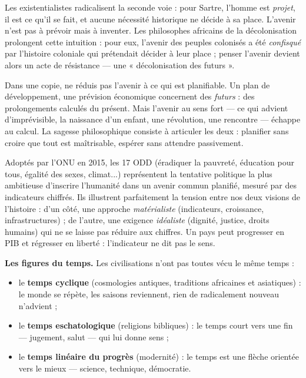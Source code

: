 \documentclass[11pt]{article}
\newcounter{popsec}
\newcounter{popsub}
\newcommand{\courssub}[1]{%
  \stepcounter{popsub}%
  \par\vspace{9pt}\noindent{\popxbold\fontsize{11.5}{13}\selectfont\color{popink}{\color{poporange}\thepopsec.\thepopsub}\hspace{6pt}#1}\par\nopagebreak\vspace{4pt}
}
\begin{document}
Les existentialistes radicalisent la seconde voie : pour Sartre, l'homme est \emph{projet}, il est ce qu'il se fait, et aucune nécessité historique ne décide à sa place. L'avenir n'est pas à prévoir mais à inventer. Les philosophes africains de la décolonisation prolongent cette intuition : pour eux, l'avenir des peuples colonisés a été \emph{confisqué} par l'histoire coloniale qui prétendait décider à leur place ; penser l'avenir devient alors un acte de résistance — une « décolonisation des futurs ».

\begin{attention}
Dans une copie, ne réduis pas l'avenir à ce qui est planifiable. Un plan de développement, une prévision économique concernent des \emph{futurs} : des prolongements calculés du présent. Mais l'avenir au sens fort — ce qui advient d'imprévisible, la naissance d'un enfant, une révolution, une rencontre — échappe au calcul. La sagesse philosophique consiste à articuler les deux : planifier sans croire que tout est maîtrisable, espérer sans attendre passivement.
\end{attention}

\begin{exemplebox}
Adoptés par l'ONU en 2015, les 17 ODD (éradiquer la pauvreté, éducation pour tous, égalité des sexes, climat...) représentent la tentative politique la plus ambitieuse d'inscrire l'humanité dans un avenir commun planifié, mesuré par des indicateurs chiffrés. Ils illustrent parfaitement la tension entre nos deux visions de l'histoire : d'un côté, une approche \emph{matérialiste} (indicateurs, croissance, infrastructures) ; de l'autre, une exigence \emph{idéaliste} (dignité, justice, droits humains) qui ne se laisse pas réduire aux chiffres. Un pays peut progresser en PIB et régresser en liberté : l'indicateur ne dit pas le sens.
\end{exemplebox}

\courssub{Le temps historique et l'irréversibilité}

\textbf{Les figures du temps.} Les civilisations n'ont pas toutes vécu le même temps :

\begin{itemize}
\item le \textbf{temps cyclique} (cosmologies antiques, traditions africaines et asiatiques) : le monde se répète, les saisons reviennent, rien de radicalement nouveau n'advient ;
\item le \textbf{temps eschatologique} (religions bibliques) : le temps court vers une fin — jugement, salut — qui lui donne sens ;
\item le \textbf{temps linéaire du progrès} (modernité) : le temps est une flèche orientée vers le mieux — science, technique, démocratie.
\end{itemize}
\end{document}
